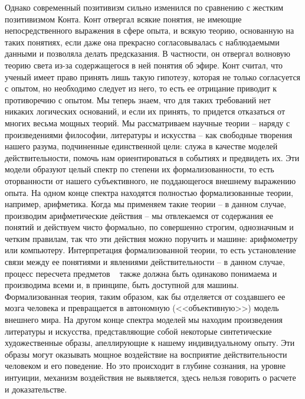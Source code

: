 \documentclass{book}
\begin{document}
Однако современный позитивизм сильно изменился по срав­нению с жестким позитивизмом Конта. Конт отвергал всякие понятия, не имеющие непосредственного выражения в сфере опыта, и всякую теорию, основанную на таких понятиях, если даже она прекрасно согласовывалась с наблюдаемыми данными и позволяла делать предсказания. В частности, он отвергал волновую теорию света из-за содержащегося в ней понятия об эфире. Конт считал, что ученый имеет право принять лишь такую гипотезу, которая не только согласуется с опытом, но необходимо следует из него, то есть ее отрицание приводит к противоречию с опытом. Мы теперь знаем, что для таких требований нет никаких логических оснований, и если их принять, то придется отказаться от многих весьма мощных теорий. Мы рассматриваем научные теории -- наряду с произведениями философии, литературы и искусства -- как свободные творения нашего ра­зума, подчиненные единственной цели: служа в качестве моделей действительности, помочь нам ориентироваться в событиях и предвидеть их. Эти 
модели образуют целый спектр по степени их формализованности,  то есть оторванности от нашего субъек­тивного, не поддающегося внешнему выражению опыта. На од­ном конце спектра находятся полностью формализованные теории, например, арифметика. Когда мы применяем такие теории -- в данном случае, производим арифметические действия -- мы отвлекаемся от содержания ее понятий и действуем чисто формально, по совершенно строгим, однозначным и четким правилам, так что эти действия можно поручить и машине: арифмометру или компьютеру. Интерпретация формализованной теории, то есть установление связи между ее понятиями и явлениями действительности -- в данном случае, процесс пересчета предметов ~ также должна быть одинаково понимаема и производима всеми и, в принципе, быть доступной для машины. Формализованная теория, таким образом, как бы отделяется от создавшего ее мозга человека и превращается в автономную (<<объективную>>) модель внешнего мира. На другом конце спектра моделей мы находим произведения литературы и 
ис­кусства, представляющие собой некоторые синтетические художественные образы, апеллирующие к нашему индивидуальному опыту. Эти образы могут оказывать мощное воздействие на восприятие действительности человеком и его поведение. Но это происходит в глубине сознания, на уровне интуиции, механизм воздействия не выявляется, здесь нельзя говорить о расчете и доказательстве.
\end{document}

